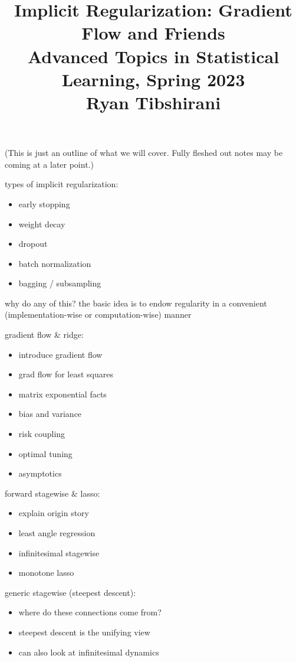 \documentclass{article}
\title{Implicit Regularization: Gradient Flow and Friends \\ \smallskip
\large Advanced Topics in Statistical Learning, Spring 2023 \\ \smallskip
Ryan Tibshirani }
\date{}
\begin{document}
\maketitle
\RaggedRight
\vspace{-50pt}

(This is just an outline of what we will cover. Fully fleshed out notes may be
coming at a later point.)  


\bigskip
types of implicit regularization:

\begin{itemize}
\item early stopping 
\item weight decay 
\item dropout 
\item batch normalization 
\item bagging / subsampling
\end{itemize}

why do any of this? the basic idea is to endow regularity in a convenient
(implementation-wise or computation-wise) manner  

\bigskip
gradient flow \& ridge:

\begin{itemize}
\item introduce gradient flow 
\item grad flow for least squares 
\item matrix exponential facts
\item bias and variance 
\item risk coupling 
\item optimal tuning 
\item asymptotics
\end{itemize}

\bigskip 
forward stagewise \& lasso:

\begin{itemize}
\item explain origin story
\item least angle regression
\item infinitesimal stagewise 
\item monotone lasso
\end{itemize}

\bigskip 
generic stagewise (steepest descent):

\begin{itemize}
\item where do these connections come from?
\item steepest descent is the unifying view
\item can also look at infinitesimal dynamics
\end{itemize}
\end{document}
